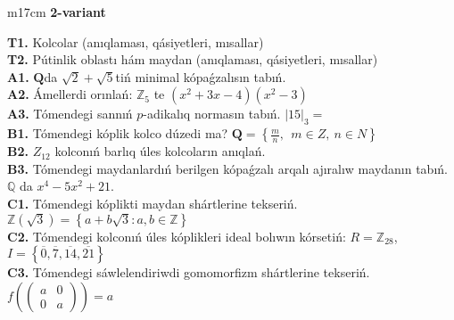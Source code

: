 \documentclass{article}
\begin{document}
\begin{tabular}{m{17cm}}
\textbf{2-variant}
\newline

\textbf{T1.} Kolcolar (anıqlaması, qásiyetleri, mısallar) \\
\textbf{T2.} Pútinlik oblastı hám maydan (anıqlaması, qásiyetleri, mısallar) \\
\textbf{A1.} \(\mathbf{Q}\)da \(\sqrt{2} + \sqrt{5}\)tiń minimal kópaǵzalısın tabıń. \\
\textbf{A2.} Ámellerdi orınlań: \(\mathbb{Z}_{5}\) te \(\left( x^{2} + 3x - 4 \right)\left( x^{2} - 3 \right)\) \\
\textbf{A3.} Tómendegi sannıń \(p\)-adikalıq normasın tabıń. \(|15|_{3} =\) \\
\textbf{B1.} Tómendegi kóplik kolco dúzedi ma? \(\mathbf{Q} = \left\{ \frac{m}{n},\ \ m \in Z,\ n \in N \right\}\) \\
\textbf{B2.} \(Z_{12}\) kolconıń barlıq úles kolcoların anıqlań. \\
\textbf{B3.} Tómendegi maydanlardıń berilgen kópaǵzalı arqalı ajıralıw maydanın tabıń.
\(\mathbb{Q}\) da \(x^{4} - 5x^{2} + 21\). \\
\textbf{C1.} Tómendegi kóplikti maydan shártlerine tekseriń. \(\mathbb{Z}\left( \sqrt{3} \right) = \left\{ a + b\sqrt{3}:a,b \in \mathbb{Z} \right\}\) \\
\textbf{C2.} Tómendegi kolconıń úles kóplikleri ideal bolıwın kórsetiń:
\(R = \mathbb{Z}_{28}\), \(I = \left\{ \overline{0},\overline{7},\overline{14},\overline{21} \right\}\) \\
\textbf{C3.} Tómendegi sáwlelendiriwdi gomomorfizm shártlerine tekseriń. \(f\left( \begin{pmatrix}
a & 0 \\
0 & a
\end{pmatrix} \right) = a\) \\

\end{tabular}
\vspace{1cm}
\end{document}
